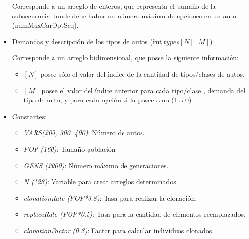 \begin{itemize}
		Corresponde a un arreglo de enteros, que representa el tamaño de la subsecuencia donde debe haber un número máximo de opciones en un auto (numMaxCarOptSeq).

	\item Demandas y descripción de los tipos de autos ($\textbf{int}\ types[N][M]$):
	
	Corresponde a un arreglo bidimensional, que posee la siguiente información:
	\begin{itemize}
		\item $[N]$ posee sólo el valor del índice de la cantidad de tipos/clases de autos.
		\item $[M]$ posee el valor del índice anterior para cada tipo/clase , demanda del tipo de auto, y para cada opción si la posee o no (1 o 0).
	\end{itemize}
	\item Constantes:

		\begin{itemize}
			\item \emph{VARS(200, 300, 400)}: Número de autos.
			\item \emph{POP (160)}: Tamaño población
			\item \emph{GENS (2000)}: Número máximo de generaciones.
			\item \emph{N (128)}: Variable para crear arreglos determinados.
			\item \emph{clonationRate (POP*0.8)}: Tasa para realizar la clonación.
			\item \emph{replaceRate (POP*0.5)}: Tasa para la cantidad de elementos reemplazados.
			\item \emph{clonationFactor (0.8)}: Factor para calcular individuos clonados.
		\end{itemize}

\end{itemize}
